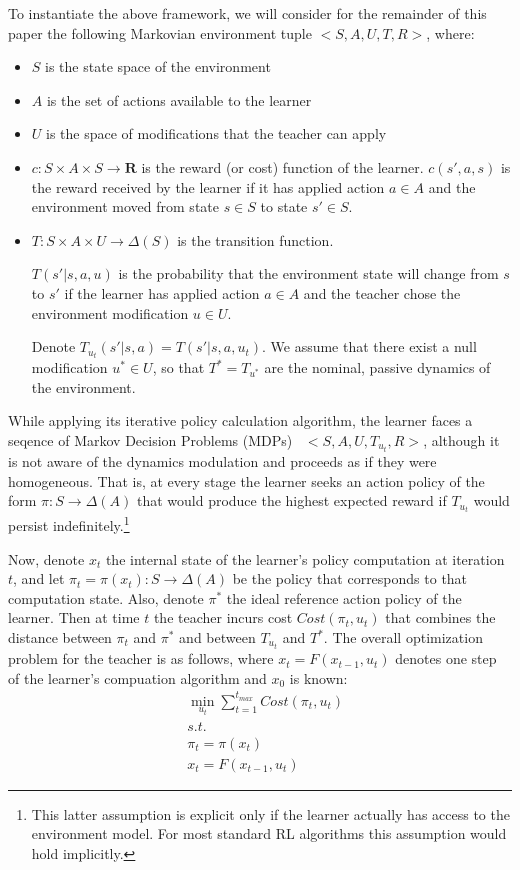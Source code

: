 \documentclass[letterpaper]{aamas2009}
\begin{document}
To instantiate the above framework, we will consider for the remainder
of this paper the following Markovian environment tuple $<S,A,U,T,R>$,
where:
\begin{itemize}
\item $S$ is the state space of the environment
\item $A$ is the set of actions available to the learner
\item $U$ is the space of modifications that the teacher can apply
\item $c:S\times A\times S\rightarrow\mathbf{R}$ is the reward (or
  cost) function of the learner. $c(s',a,s)$ is the reward received by
  the learner if it has applied action $a\in A$ and the environment
  moved from state $s\in S$ to state $s'\in S$.
\item $T:S\times A\times U\rightarrow\Delta(S)$ is the transition
  function. 

$T(s'|s,a,u)$ is the probability that the
  environment state will change from $s$ to $s'$ if the learner has
  applied action $a\in A$ and the teacher chose the environment
  modification $u\in U$.

Denote $T_{u_t}(s'|s,a)=T(s'|s,a,u_t)$. We assume that there exist a null
  modification $u^*\in U$, so that $T^*=T_{u^*}$ are the nominal,
  passive dynamics of the environment.
\end{itemize}

While applying its iterative policy calculation algorithm, the learner
faces a seqence of Markov Decision Problems (MDPs)~\cite{puterman_book_94}
$<S,A,U,T_{u_t},R>$, although it is not aware of the dynamics
modulation and proceeds as if they were homogeneous. That is, at every
stage the learner seeks an action policy of the form
$\pi:S\rightarrow\Delta(A)$ that would produce the highest expected
reward if $T_{u_t}$ would persist indefinitely.\footnote{This latter
  assumption is explicit only if the learner actually has access to
  the environment model. For most standard RL algorithms this
  assumption would hold implicitly.}

Now, denote $x_t$ the internal state of the learner's policy
computation at iteration $t$, and let
$\pi_t=\pi(x_t):S\rightarrow\Delta(A)$ be the policy that corresponds
to that computation state. Also, denote $\pi^*$ the ideal reference
action policy of the learner. Then at time $t$ the teacher incurs cost
$Cost(\pi_t,u_t)$ that combines the distance between $\pi_t$ and
$\pi^*$ and between $T_{u_t}$ and $T^*$. The overall optimization
problem for the teacher is as follows, where $x_t=F(x_{t-1},u_t)$
denotes one step of the learner's compuation algorithm and $x_0$ is
known:
\begin{eqnarray*}
&\min\limits_{u_t}\sum\limits_{t=1}^{t_{max}}Cost(\pi_t,u_t)\\
&s.t.\\
&\pi_t=\pi(x_t)\\
&x_t=F(x_{t-1},u_t)
\end{eqnarray*}
\end{document}
